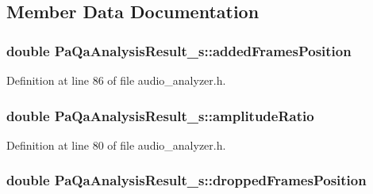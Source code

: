 \subsection{Member Data Documentation}
\subsubsection[{\texorpdfstring{added\+Frames\+Position}{addedFramesPosition}}]{\setlength{\rightskip}{0pt plus 5cm}double Pa\+Qa\+Analysis\+Result\+\_\+s\+::added\+Frames\+Position}\hypertarget{struct_pa_qa_analysis_result__s_a54d571e9c681cdaf3901744c0dd84d10}{}\label{struct_pa_qa_analysis_result__s_a54d571e9c681cdaf3901744c0dd84d10}


Definition at line 86 of file audio\+\_\+analyzer.\+h.

\subsubsection[{\texorpdfstring{amplitude\+Ratio}{amplitudeRatio}}]{\setlength{\rightskip}{0pt plus 5cm}double Pa\+Qa\+Analysis\+Result\+\_\+s\+::amplitude\+Ratio}\hypertarget{struct_pa_qa_analysis_result__s_a3db306b382cb9b01f4954e078f1f0d4c}{}\label{struct_pa_qa_analysis_result__s_a3db306b382cb9b01f4954e078f1f0d4c}


Definition at line 80 of file audio\+\_\+analyzer.\+h.

\subsubsection[{\texorpdfstring{dropped\+Frames\+Position}{droppedFramesPosition}}]{\setlength{\rightskip}{0pt plus 5cm}double Pa\+Qa\+Analysis\+Result\+\_\+s\+::dropped\+Frames\+Position}\hypertarget{struct_pa_qa_analysis_result__s_a5465c8dc21981f08bce260e864882808}{}\label{struct_pa_qa_analysis_result__s_a5465c8dc21981f08bce260e864882808}


